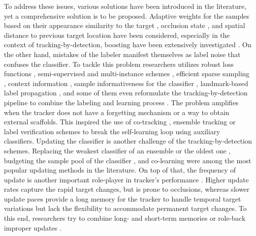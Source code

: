 \documentclass[10pt, conference, compsocconf]{IEEEtran}
\begin{document}
To address these issues, various solutions have been introduced in the literature, yet a comprehensive solution is to be proposed. Adaptive weights for the samples based on their appearance similarity to the target \cite{perez2002color}, occlusion state \cite{kwak2011learning,meshgi2016data}, and spatial distance to previous target location \cite{wu2015robust} have been considered, especially in the context of tracking-by-detection, boosting \cite{freund1995desicion,oza2000online} have been extensively investigated \cite{grabner2006real,leistner2009robustness,babenko2009visual}. 
On the other hand, mistakes of the labeler manifest themselves as label noise that confuses the classifier. To tackle this problem researchers utilizes robust loss functions \cite{leistner2009robustness,masnadi2010design}, semi-supervised \cite{grabner2008semi,leistner2009semi} and multi-instance schemes \cite{babenko2009visual,zeisl2010online}, efficient sparse sampling \cite{henriques2015high}, context information \cite{grabner2010tracking,dinh2011context}, sample informativeness for the classifier \cite{zhang2013robust}, landmark-based label propagation \cite{wu2015robust}, and some of them even reformulate the tracking-by-detection pipeline to combine the labeling and learning process \cite{hare2011struck}.
The problem amplifies when the tracker does not have a forgetting mechanism or a way to obtain external scaffolds. This inspired the use of co-tracking \cite{tang2007co}, ensemble tracking \cite{saffari2009line,zhang2014meem} or label verification schemes \cite{kalal2012tracking} to break the self-learning loop using auxiliary classifiers.
Updating the classifier is another challenge of the tracking-by-detection schemes. Replacing the weakest classifier of an ensemble \cite{grabner2006real} or the oldest one \cite{avidan2007ensemble}, budgeting the sample pool of the classifier \cite{hare2011struck}, and co-learning \cite{tang2007co} were among the most popular updating methods in the literature. On top of that, the frequency of update is another important role-player in tracker's performance \cite{grabner2008semi}. Higher update rates capture the rapid target changes, but is prone to occlusions, whereas slower update paces provide a long memory for the tracker to handle temporal target variations but lack the flexibility to accommodate permanent target changes. To this end, researchers try to combine long- and short-term memories \cite{hong2015multi} or role-back improper updates \cite{zhang2014meem}.
\end{document}
